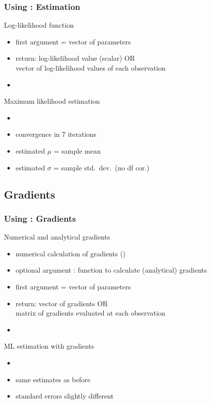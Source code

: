 \documentclass{beamer}
\begin{document}
\begin{frame}
\frametitle{Using : Estimation}
Log-likelihood function
\begin{itemize}
\item first argument = vector of parameters
\item return: log-likelihood value (scalar) OR\\
   vector of log-likelihood values of each observation
\item {}
\end{itemize}
\vspace*{2ex}
Maximum likelihood estimation
\begin{itemize}
\item {}
\item convergence in 7 iterations
\item estimated $\mu$ = sample mean
\item estimated $\sigma$ = sample std.\ dev.\ (no df cor.)
\end{itemize}
\end{frame}

\subsection{Gradients}
\begin{frame}
\frametitle{Using : Gradients}
Numerical and analytical gradients
\begin{itemize}
\item numerical calculation of gradients
   ()
\item optional argument :
   function to calculate (analytical) gradients
\item first argument = vector of parameters
\item return: vector of gradients OR\\
   matrix of gradients evaluated at each observation
\item {}
\end{itemize}
\vspace*{2ex}
ML estimation with gradients
\begin{itemize}
\item {}
\item same estimates as before
\item standard errors slightly different
\end{itemize}
\end{frame}
\end{document}
